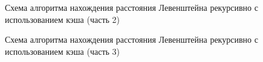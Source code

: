 \begin{figure}[p]
	\caption{Схема алгоритма нахождения расстояния Левенштейна рекурсивно с использованием кэша (часть 2)}
	\label{img_rec_cache_2}
\end{figure}
\begin{figure}[h]
	\caption{Схема алгоритма нахождения расстояния Левенштейна рекурсивно с использованием кэша (часть 3)}
	\label{img_rec_cache_3}
\end{figure}
\newpage


